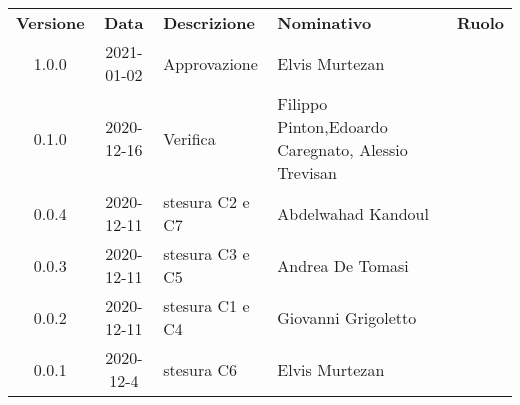 {
    \renewcommand{\arraystretch}{1.5}
    \centering
    \begin{longtable}{ c c  C{3.5cm}  C{4cm}  c }
        \rowcolor{\primaryColor}
        \textcolor{\secondaryColor}{
        \textbf{Versione}}     & \textcolor{\secondaryColor}{\textbf{Data}}       & \textcolor{\secondaryColor}
        {\textbf{Descrizione}} & \textcolor{\secondaryColor}{\textbf{Nominativo}} & \textcolor{\secondaryColor}{\textbf{Ruolo}}                          \\


        1.0.0   &2021-01-02 &Approvazione &Elvis Murtezan &\responsabile{}\\
        0.1.0                  &2020-12-16                                      & Verifica                          &Filippo Pinton,\newline Edoardo Caregnato, \newline Alessio Trevisan &\verificatore{}\\
		0.0.4                  & 2020-12-11                                       & stesura C2 e C7                     & Abdelwahad Kandoul & \redattore{}    \\
        0.0.3                  & 2020-12-11                                       & stesura C3 e C5    					& Andrea De Tomasi & \redattore{}    \\
        0.0.2                  & 2020-12-11                                       & stesura C1 e C4   					& Giovanni Grigoletto& \redattore{} \\        
        0.0.1                  & 2020-12-4                                       & stesura C6 & Elvis Murtezan & \redattore{} \\
    \end{longtable}
}